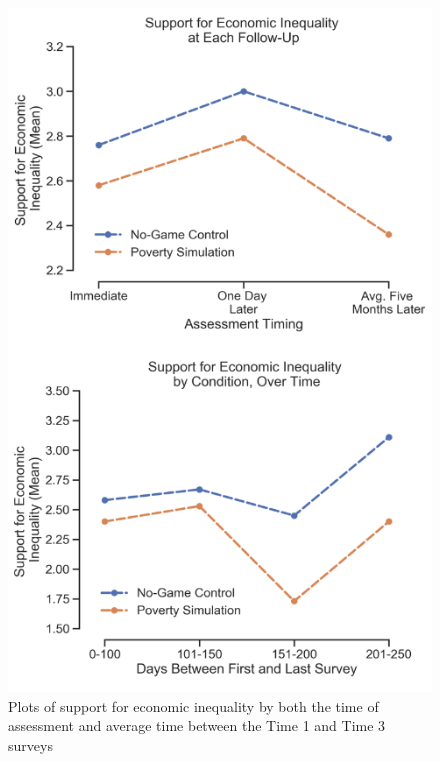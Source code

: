 \documentclass{sfuthesis}
\begin{document}
\begin{figure}
  \includegraphics[scale=.75]{Fig3-3.png}
  \caption{Plots of support for economic inequality by both the time of assessment and average time between the Time 1 and Time 3 surveys}
  \label{fig:fifthfig}
\end{figure}
\end{document}
